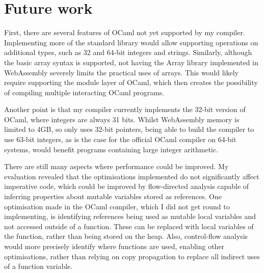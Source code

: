\section{Future work}
First, there are several features of OCaml not yet supported by my compiler. Implementing more of the standard library would allow supporting operations on additional types, such as 32 and 64-bit integers and strings.
Similarly, although the basic array syntax is supported, not having the Array library implemented in WebAssembly severely limits the practical uses of arrays. This would likely require supporting the module layer of OCaml, which then creates the possibility of compiling multiple interacting OCaml programs.

Another point is that my compiler currently implements the 32-bit version of OCaml, where integers are always 31 bits. 
Whilst WebAssembly memory is limited to 4GB, so only uses 32-bit pointers, being able to build the compiler to use 63-bit integers, as is the case for the official OCaml compiler on 64-bit systems, would benefit programs containing large integer arithmetic.

There are still many aspects where performance could be improved. 
My evaluation revealed that the optimisations implemented do not significantly affect imperative code, which could be improved by flow-directed analysis capable of inferring properties about mutable variables stored as references.
%
One optimisation made in the OCaml compiler, which I did not get round to implementing, is identifying references being used as mutable local variables and not accessed outside of a function. These can be replaced with local variables of the function, rather than being stored on the heap.
Also, control-flow analysis would more precisely identify where functions are used, enabling other optimisations, rather than relying on copy propagation to replace all indirect uses of a function variable.

